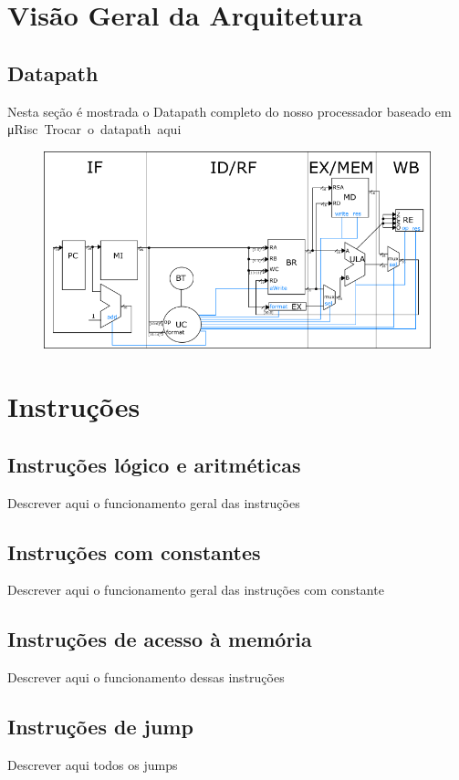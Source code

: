\documentclass{article}
\begin{document}
  
  \newpage
\section{Visão Geral da Arquitetura}


\subsection{Datapath}
Nesta seção é mostrada o Datapath completo do nosso processador baseado em \si\micro Risc. 

  Trocar o datapath aqui
\begin{figure}[H]
	\centering
	\includegraphics[width=\textwidth]{./pictures/datapath.png}
\end{figure}


\section{Instruções}
\subsection{Instruções lógico e aritméticas}
    Descrever aqui o funcionamento geral das instruções 

\subsection{Instruções com constantes}
   Descrever aqui o funcionamento geral das instruções com constante

\subsection{Instruções de acesso à memória}
    Descrever aqui o funcionamento dessas instruções

\subsection{Instruções de jump}
    Descrever aqui todos os jumps
    
\end{document}
